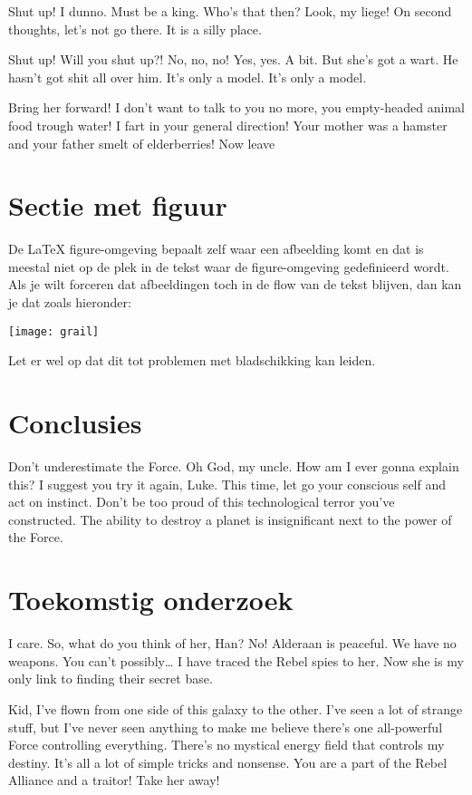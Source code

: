 \documentclass[a0,portrait]{hogent-poster}
\begin{document}
\begin{multicols}{2}
Shut up! I dunno. Must be a king. Who's that then? Look, my liege! On second thoughts, let's not go there. It is a silly place.

Shut up! Will you shut up?! No, no, no! Yes, yes. A bit. But she's got a wart. He hasn't got shit all over him. It's only a model. It's only a model.

Bring her forward! I don't want to talk to you no more, you empty-headed animal food trough water! I fart in your general direction! Your mother was a hamster and your father smelt of elderberries! Now leave 

\section{Sectie met figuur}

De {\LaTeX} figure-omgeving bepaalt zelf waar een afbeelding komt en dat is meestal niet op de plek in de tekst waar de figure-omgeving gedefinieerd wordt. Als je wilt forceren dat afbeeldingen toch in de flow van de tekst blijven, dan kan je dat zoals hieronder:

\begin{center}
  \captionsetup{type=figure}
  \texttt{[image: grail]}
\end{center}

Let er wel op dat dit tot problemen met bladschikking kan leiden.

\section{Conclusies}

Don't underestimate the Force. Oh God, my uncle. How am I ever gonna explain this? I suggest you try it again, Luke. This time, let go your conscious self and act on instinct. Don't be too proud of this technological terror you've constructed. The ability to destroy a planet is insignificant next to the power of the Force.

\section{Toekomstig onderzoek}

I care. So, what do you think of her, Han? No! Alderaan is peaceful. We have no weapons. You can't possibly… I have traced the Rebel spies to her. Now she is my only link to finding their secret base.

Kid, I've flown from one side of this galaxy to the other. I've seen a lot of strange stuff, but I've never seen anything to make me believe there's one all-powerful Force controlling everything. There's no mystical energy field that controls my destiny. It's all a lot of simple tricks and nonsense. You are a part of the Rebel Alliance and a traitor! Take her away! 

\end{multicols}
\end{document}

